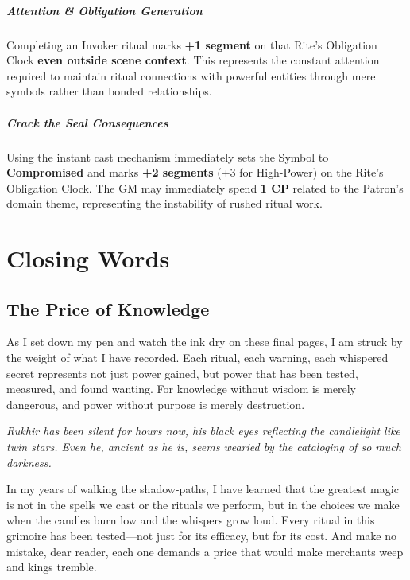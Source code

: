 \documentclass[12pt,twoside]{book}
\newcommand{\shadow}[1]{\textit{#1}}
\begin{document}
\paragraph{Attention & Obligation Generation} Completing an Invoker ritual marks \textbf{+1 segment} on that Rite's Obligation Clock \textbf{even outside scene context}. This represents the constant attention required to maintain ritual connections with powerful entities through mere symbols rather than bonded relationships.

\paragraph{Crack the Seal Consequences} Using the instant cast mechanism immediately sets the Symbol to \textbf{Compromised} and marks \textbf{+2 segments} (+3 for High-Power) on the Rite's Obligation Clock. The GM may immediately spend \textbf{1 CP} related to the Patron's domain theme, representing the instability of rushed ritual work.

\chapter{Closing Words}

\section*{The Price of Knowledge}

\lettrine[lines=3]{A}{}s I set down my pen and watch the ink dry on these final pages, I am struck by the weight of what I have recorded. Each ritual, each warning, each whispered secret represents not just power gained, but power that has been tested, measured, and found wanting. For knowledge without wisdom is merely dangerous, and power without purpose is merely destruction.

\shadow{Rukhir has been silent for hours now, his black eyes reflecting the candlelight like twin stars. Even he, ancient as he is, seems wearied by the cataloging of so much darkness.}

In my years of walking the shadow-paths, I have learned that the greatest magic is not in the spells we cast or the rituals we perform, but in the choices we make when the candles burn low and the whispers grow loud. Every ritual in this grimoire has been tested—not just for its efficacy, but for its cost. And make no mistake, dear reader, each one demands a price that would make merchants weep and kings tremble.
\end{document}
